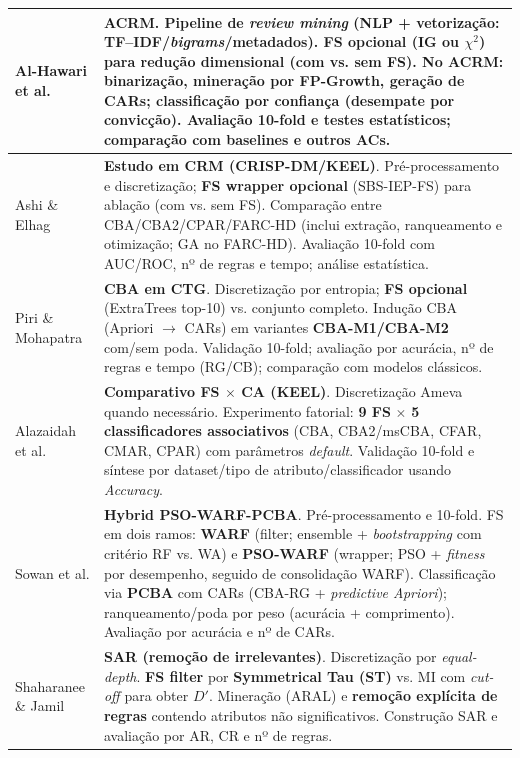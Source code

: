 \begin{xltabular}{\textwidth}{|p{4cm}|>{\raggedright\arraybackslash}X|}
Al-Hawari et al. \cite{alhawari2021classification} &
\textbf{ACRM}. Pipeline de \textit{review mining} (NLP + vetorização: TF--IDF/\textit{bigrams}/metadados). \textbf{FS opcional} (IG ou $\chi^2$) para redução dimensional (com vs. sem FS). No ACRM: binarização, mineração por \textbf{FP-Growth}, geração de CARs; classificação por \textbf{confiança} (desempate por \textbf{convicção}). Avaliação 10-fold e testes estatísticos; comparação com baselines e outros ACs. \\
\hline

Ashi \& Elhag \cite{ashi2021enhancing} &
\textbf{Estudo em CRM (CRISP-DM/KEEL)}. Pré-processamento e discretização; \textbf{FS wrapper opcional} (SBS-IEP-FS) para ablação (com vs. sem FS). Comparação entre CBA/CBA2/CPAR/FARC-HD (inclui extração, ranqueamento e otimização; GA no FARC-HD). Avaliação 10-fold com AUC/ROC, nº de regras e tempo; análise estatística. \\
\hline

Piri \& Mohapatra \cite{piri2019exploring} &
\textbf{CBA em CTG}. Discretização por entropia; \textbf{FS opcional} (ExtraTrees top-10) vs. conjunto completo. Indução CBA (Apriori $\rightarrow$ CARs) em variantes \textbf{CBA-M1/CBA-M2} com/sem poda. Validação 10-fold; avaliação por acurácia, nº de regras e tempo (RG/CB); comparação com modelos clássicos. \\
\hline

Alazaidah et al. \cite{alazaidah2021feature} &
\textbf{Comparativo FS $\times$ CA (KEEL)}. Discretização Ameva quando necessário. Experimento fatorial: \textbf{9 FS} $\times$ \textbf{5 classificadores associativos} (CBA, CBA2/msCBA, CFAR, CMAR, CPAR) com parâmetros \textit{default}. Validação 10-fold e síntese por dataset/tipo de atributo/classificador usando \textit{Accuracy}. \\
\hline

Sowan et al. \cite{sowan2023hybrid} &
\textbf{Hybrid PSO-WARF-PCBA}. Pré-processamento e 10-fold. FS em dois ramos: \textbf{WARF} (filter; ensemble + \textit{bootstrapping} com critério RF vs. WA) e \textbf{PSO-WARF} (wrapper; PSO + \textit{fitness} por desempenho, seguido de consolidação WARF). Classificação via \textbf{PCBA} com CARs (CBA-RG + \textit{predictive Apriori}); ranqueamento/poda por peso (acurácia + comprimento). Avaliação por acurácia e nº de CARs. \\
\hline

Shaharanee \& Jamil \cite{shaharanee2015irrelevant} &
\textbf{SAR (remoção de irrelevantes)}. Discretização por \textit{equal-depth}. \textbf{FS filter} por \textbf{Symmetrical Tau (ST)} vs. MI com \textit{cut-off} para obter $D'$. Mineração (ARAL) e \textbf{remoção explícita de regras} contendo atributos não significativos. Construção SAR e avaliação por AR, CR e nº de regras. \\
\hline


\end{xltabular}

